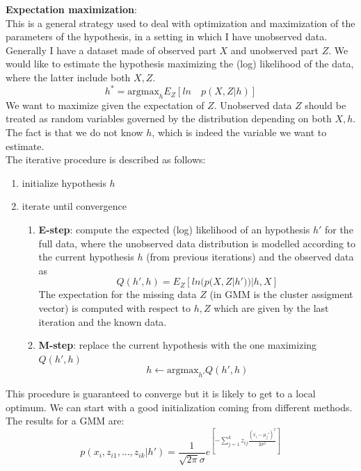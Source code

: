             \textbf{Expectation maximization}:\\
            This is a general strategy used to deal with optimization and maximization of the parameters of the hypothesis, in a setting in which I have unobserved data. Generally I have a dataset made of observed part $X$ and unobserved part $Z$.
            We would like to estimate the hypothesis maximizing the (log) likelihood of the data, where the latter include both $X, Z$. 
            $$h^* = \text{argmax}_h E_Z [ln \quad p(X, Z | h)]$$
            We want to maximize given the expectation of $Z$. Unobserved data $Z$ should be treated as random variables governed by the distribution depending on both $X, h$. The fact is that we do not know $h$, which is indeed the variable we want to estimate.\\
            The iterative procedure is described as follows:
            \begin{enumerate}
                \item initialize hypothesis $h$
                \item iterate until convergence
                \begin{enumerate}
                    \item \textbf{E-step}: compute the expected (log) likelihood of an hypothesis $h'$ for the full data, where the unobserved data distribution is modelled according to the current hypothesis $h$ (from previous iterations) and the observed data as
                    $$Q(h', h) = E_Z[ln (p(X, Z | h'))|h, X]$$
                    The expectation for the missing data $Z$ (in GMM is the cluster assigment vector) is computed with respect to $h, Z$ which are given by the last iteration and the known data.
                    \item \textbf{M-step}: replace the current hypothesis with the one maximizing $Q(h', h)$
                    $$h \leftarrow \text{argmax}_{h'} Q(h', h)$$
                \end{enumerate}
            \end{enumerate}

            This procedure is guaranteed to converge but it is likely to get to a local optimum. We can start with a good initialization coming from different methods. \\

            The results for a GMM are:
            $$p(x_i, z_{i1}, \dots, z_{ik} | h') = 
            \frac{1}{\sqrt{2 \pi} \sigma}       
            e^ {
            \left[ 
                - \sum _{j=1} ^k z_{ij} \frac{(x_i - \mu_j ') ^2}{2 \sigma ^2}
            \right]}
            $$

